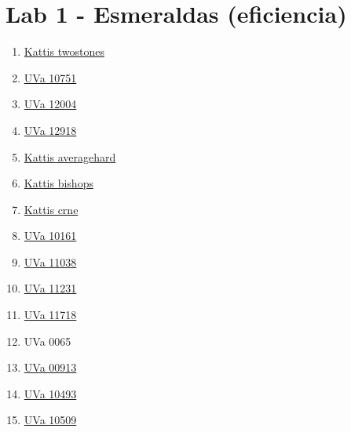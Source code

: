 

\maketitle
\tableofcontents
\section{Lab 1 - Esmeraldas (eficiencia)}
        \begin{enumerate}
\item \href{https://open.kattis.com/problems/twostones}{Kattis twostones}
\item \href{https://onlinejudge.org/index.php?option=com_onlinejudge&Itemid=8&page=show_problem&problem=1692}{UVa 10751}
\item \href{https://onlinejudge.org/index.php?option=com_onlinejudge&Itemid=8&page=show_problem&problem=3155}{UVa 12004}
\item \href{https://onlinejudge.org/index.php?option=com_onlinejudge&Itemid=8&page=show_problem&problem=4797}{UVa 12918}
\item \href{https://open.kattis.com/problems/averagehard}{Kattis averagehard}
\item \href{https://open.kattis.com/problems/bishops}{Kattis bishops}
\item \href{https://open.kattis.com/problems/crne}{Kattis crne}
\item \href{https://onlinejudge.org/index.php?option=com_onlinejudge&Itemid=8&page=show_problem&problem=1102}{UVa 10161}
\item \href{https://onlinejudge.org/index.php?option=com_onlinejudge&Itemid=8&page=show_problem&problem=1979}{UVa 11038}
\item \href{https://onlinejudge.org/index.php?option=com_onlinejudge&Itemid=8&page=show_problem&problem=2172}{UVa 11231}
\item \href{https://onlinejudge.org/index.php?option=com_onlinejudge&Itemid=8&page=show_problem&problem=2765}{UVa 11718}
\item {UVa 0065}
\item \href{https://onlinejudge.org/index.php?option=com_onlinejudge&Itemid=8&page=show_problem&problem=854}{UVa 00913}
\item \href{https://onlinejudge.org/index.php?option=com_onlinejudge&Itemid=8&page=show_problem&problem=1434}{UVa 10493}
\item \href{https://onlinejudge.org/index.php?option=com_onlinejudge&Itemid=8&page=show_problem&problem=1450}{UVa 10509}

\end{enumerate}
